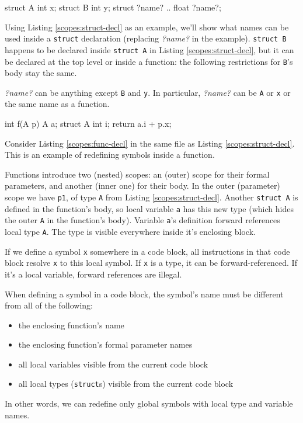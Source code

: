 \documentclass[a4paper]{article}
\begin{document}
\begin{program}
\begin{verbatimtab}
struct A {
	int x;
	struct B {
		int y;
		struct ?name? { .. }
		float ?name?;
	}
}
\end{verbatimtab}
\caption{Struct scopes: restrictions for contained names%
	\label{scopes:struct-decl}}
\end{program}

Using Listing \ref{scopes:struct-decl} as an example,
we'll show what names can be used inside a \verb=struct= declaration
(replacing \emph{?name?} in the example).
\verb=struct B= happens to be declared inside \verb=struct A=
in Listing \ref{scopes:struct-decl},
but it can be declared at the top level or inside a function:
the following restrictions for \verb=B='s body stay the same.

\emph{?name?} can be anything except \verb=B= and \verb=y=.
In particular, \emph{?name?} can be \verb=A= or \verb=x=
or the same name as a function.

\begin{program}
\begin{verbatimtab}
int f(A p) {
	A a;
	struct A {
		int i;
	}
	return a.i + p.x;
}
\end{verbatimtab}
\caption{Function scopes: defining local variables and types%
	\label{scopes:func-decl}}
\end{program}

Consider Listing \ref{scopes:func-decl} in the same file as
Listing \ref{scopes:struct-decl}.
This is an example of redefining symbols inside a function.

Functions introduce two (nested) scopes:
an (outer) scope for their formal parameters,
and another (inner one) for their body.
In the outer (parameter) scope we have \verb=p1=,
of type \verb=A= from Listing \ref{scopes:struct-decl}.
Another \verb=struct A= is defined in the function's body, 
so local variable \verb=a= has this new type
(which hides the outer \verb=A= in the function's body).
Variable \verb=a='s definition forward references local type \verb=A=.
The type is visible everywhere inside it's enclosing block.

If we define a symbol \verb=x= somewhere in a code block,
all instructions in that code block resolve \verb=x= to this local symbol.
If \verb=x= is a type, it can be forward-referenced.
If it's a local variable, forward references are illegal.

When defining a symbol in a code block,
the symbol's name must be different from all of the following:
\begin{itemize}
\item the enclosing function's name
\item the enclosing function's formal parameter names
\item all local variables visible from the current code block
\item all local types (\verb=struct=s) visible from the current code block
\end{itemize}
In other words, we can redefine only global symbols
with local type and variable names.
\end{document}
